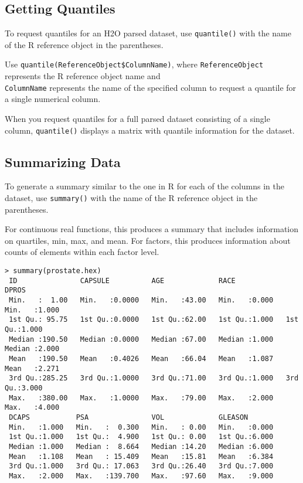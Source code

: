 {{\subsection{Getting Quantiles}

To request quantiles for an H2O parsed dataset, use {\texttt{quantile()}} with the name of the R reference object in the parentheses.

Use  {\texttt{quantile(ReferenceObject\$ColumnName)}},  where {\texttt{ReferenceObject}} represents the R reference object name and \\{\texttt{ColumnName}} represents the name of the specified column to request a quantile for a single numerical column.

When you request quantiles for a full parsed dataset consisting of a single column, {\texttt{quantile()}} displays a matrix with quantile information for the dataset.

\newpage
\waterExampleInR
\medskip


\subsection{Summarizing Data}

To generate a summary similar to the one in R for each of the columns in the dataset, use {\texttt{summary()}} with the name of the R reference object in the parentheses.

For continuous real functions, this produces a summary that includes information on quartiles, min, max, and mean.
For factors, this produces information about counts of elements within each factor level.

\waterExampleInR
\medskip

\small
\begin{lstlisting}[style=R]
> summary(prostate.hex)
 ID               CAPSULE          AGE             RACE            DPROS
 Min.   :  1.00   Min.   :0.0000   Min.   :43.00   Min.   :0.000   Min.   :1.000
 1st Qu.: 95.75   1st Qu.:0.0000   1st Qu.:62.00   1st Qu.:1.000   1st Qu.:1.000
 Median :190.50   Median :0.0000   Median :67.00   Median :1.000   Median :2.000
 Mean   :190.50   Mean   :0.4026   Mean   :66.04   Mean   :1.087   Mean   :2.271
 3rd Qu.:285.25   3rd Qu.:1.0000   3rd Qu.:71.00   3rd Qu.:1.000   3rd Qu.:3.000
 Max.   :380.00   Max.   :1.0000   Max.   :79.00   Max.   :2.000   Max.   :4.000
 DCAPS           PSA               VOL             GLEASON
 Min.   :1.000   Min.   :  0.300   Min.   : 0.00   Min.   :0.000
 1st Qu.:1.000   1st Qu.:  4.900   1st Qu.: 0.00   1st Qu.:6.000
 Median :1.000   Median :  8.664   Median :14.20   Median :6.000
 Mean   :1.108   Mean   : 15.409   Mean   :15.81   Mean   :6.384
 3rd Qu.:1.000   3rd Qu.: 17.063   3rd Qu.:26.40   3rd Qu.:7.000
 Max.   :2.000   Max.   :139.700   Max.   :97.60   Max.   :9.000
\end{lstlisting}
\normalsize

}}
